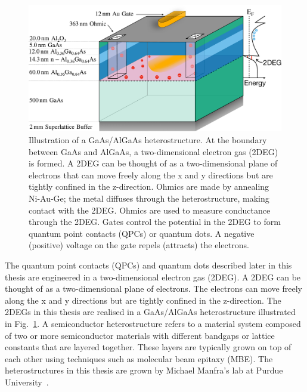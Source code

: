 \begin{figure}[!htb]
 \begin{center}
  \includegraphics[width=1.0\textwidth]{figures/ch1/figure2.pdf}
  \caption[GaAs/AlGaAs Heterostructure]{\label{fig:ch1/2deg} 
  Illustration of a GaAs/AlGaAs heterostructure. At the boundary between GaAs and AlGaAs, a two-dimensional electron gas (2DEG) is formed. A 2DEG can be thought of as a two-dimensional plane of electrons that can move freely along the x and y directions but are tightly confined in the z-direction. Ohmics are made by annealing Ni-Au-Ge; the metal diffuses through the heterostructure, making contact with the 2DEG. Ohmics are used to measure conductance through the 2DEG. Gates control the potential in the 2DEG to form quantum point contacts (QPCs) or quantum dots. A negative (positive) voltage on the gate repels (attracts) the electrons.
   }
 \end{center}
\end{figure}



The quantum point contacts (QPCs) and quantum dots described later in this thesis are engineered in a two-dimensional electron gas (2DEG). A 2DEG can be thought of as a two-dimensional plane of electrons. The electrons can move freely along the x and y directions but are tightly confined in the z-direction. The 2DEGs in this thesis are realised in a GaAs/AlGaAs heterostructure illustrated in Fig.~\ref{fig:ch1/2deg}. A semiconductor heterostructure refers to a material system composed of two or more semiconductor materials with different bandgaps or lattice constants that are layered together. These layers are typically grown on top of each other using techniques such as molecular beam epitaxy (MBE). The heterostructures in this thesis are grown by Michael Manfra's lab at Purdue University~\cite{manfra_high_quality}. 

